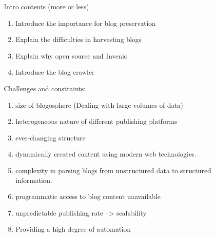
Intro contents (more or less)
\begin{enumerate}
  \item Introduce the importance for blog preservation
  \item Explain the difficulties in harvesting blogs
  \item Explain why open source and Invenio
  \item Introduce the blog crawler
\end{enumerate}

Challenges and constraints:
\begin{enumerate}
  \item size of blogosphere (Dealing with large volumes of data)
  \item heterogeneous nature of different publishing platforms
  \item ever-changing structure
  \item dynamically created content using modern web technologies.
  \item complexity in parsing blogs from unstructured data to structured information.
  \item programmatic access to blog content unavailable
  \item unpredictable publishing rate --> scalability
  \item Providing a high degree of automation
\end{enumerate}


